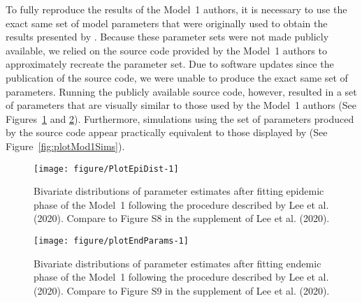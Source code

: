 To fully reproduce the results of the Model~1 authors, it is necessary to use the exact same set of model parameters that were originally used to obtain the results presented by \cite{lee20}.
Because these parameter sets were not made publicly available, we relied on the source code provided by the Model~1 authors to approximately recreate the parameter set.
Due to software updates since the publication of the source code, we were unable to produce the exact same set of parameters.
Running the publicly available source code, however, resulted in a set of parameters that are visually similar to those used by the Model~1 authors (See Figures~\ref{fig:PlotEpiDist} and \ref{fig:plotEndParams}).
Furthermore, simulations using the set of parameters produced by the source code appear practically equivalent to those displayed by \cite{lee20} (See Figure~\ref{fig:plotMod1Sims}).



\begin{knitrout}
\color{fgcolor}\begin{figure}

{\centering \texttt{[image: figure/PlotEpiDist-1]} 

}

\caption[Bivariate distributions of parameter estimates after fitting epidemic phase of the Model~1 following the procedure described by Lee et al]{Bivariate distributions of parameter estimates after fitting epidemic phase of the Model~1 following the procedure described by Lee et al. (2020). Compare to Figure S8 in the supplement of Lee et al. (2020).}\label{fig:PlotEpiDist}
\end{figure}

\end{knitrout}





\begin{knitrout}
\color{fgcolor}\begin{figure}

{\centering \texttt{[image: figure/plotEndParams-1]} 

}

\caption[Bivariate distributions of parameter estimates after fitting endemic phase of the Model~1 following the procedure described by Lee et al]{Bivariate distributions of parameter estimates after fitting endemic phase of the Model~1 following the procedure described by Lee et al. (2020). Compare to Figure S9 in the supplement of Lee et al. (2020).}\label{fig:plotEndParams}
\end{figure}

\end{knitrout}




